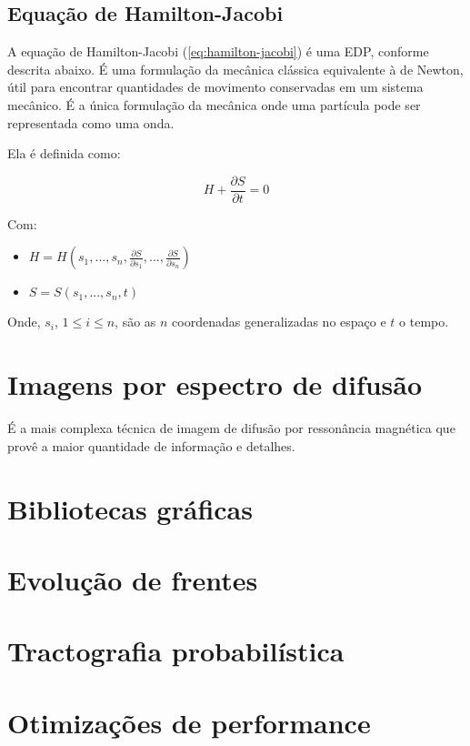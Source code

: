 \documentclass[a4paper,11pt]{report}
\begin{document}
    \subsection{Equação de Hamilton-Jacobi}
    A equação de Hamilton-Jacobi (\ref{eq:hamilton-jacobi}) é uma EDP, conforme descrita abaixo. É uma formulação da mecânica clássica equivalente à de Newton, útil para encontrar quantidades de movimento conservadas em um sistema mecânico. É a única formulação da mecânica onde uma partícula pode ser representada como uma onda.
    
    Ela é definida como: 

    \begin{equation} \label{eq:hamilton-jacobi}
      H + \frac{\partial S}{\partial t} = 0
    \end{equation}
    
    Com:
    
    \begin{itemize}
      \item $H = H(s_{1}, ..., s_{n}, \frac{\partial S}{\partial s_{1}}, ..., \frac{\partial S}{\partial s_{n}})$
      \item $S = S(s_{1}, ..., s_{n}, t)$
    \end{itemize}
    
    Onde, $s_{i}$, $1 \leq i \leq n$, são as $n$ coordenadas generalizadas no espaço e $t$ o tempo.
    
    
  \section{Imagens por espectro de difusão}
  É a mais complexa técnica de imagem de difusão por ressonância magnética que provê a maior quantidade de informação e detalhes.
  
  \section{Bibliotecas gráficas}
  
  \section{Evolução de frentes}
  
  \section{Tractografia probabilística}
  
  \section{Otimizações de performance}
  
\end{document}
